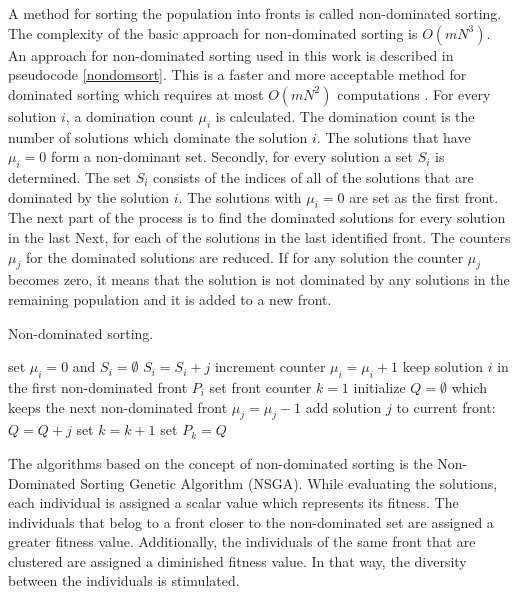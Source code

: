 A method for sorting the population into fronts is called non-dominated sorting. 
The complexity of the basic approach for non-dominated sorting is $O(mN^3)$.
An approach for non-dominated sorting used in this work is described in pseudocode 
\ref{nondomsort}. This is a faster and more acceptable method for dominated sorting which requires at most $O(mN^2)$ computations \cite{deb2001multi}.
For every solution $i$, a domination count $\mu_i$ is calculated. The domination count is the number of solutions which dominate the solution $i$. The solutions that have $\mu_i = 0$ form a non-dominant set.
Secondly, for every solution a set $S_i$ is determined. The set $S_i$ consists of the indices of all of the solutions that are dominated by the solution $i$. 
The solutions with $\mu_i=0$ are set as the first front. 
The next part of the process is to find the dominated solutions for every solution in the last 
Next, for each of the solutions in the last identified front. 
The counters $\mu_j$ for the dominated solutions are reduced. 
If for any solution the counter $\mu_j$ becomes zero, it means that the solution is not dominated by any solutions in the remaining population and it is added to a new front. 

\begin{algorithm}
\caption{Non-dominated sorting.\label{nondomsort}}
\begin{algorithmic}
\STATE set $\mu_i = 0$ and $S_i = \emptyset$
\ENDFOR
{}
\STATE $S_i = S_i + j$
\STATE increment counter $\mu_i = \mu_i + 1$
\ENDIF
{} 
\STATE keep solution $i$ in the first non-dominated front $P_i$
\STATE set front counter $k=1$
\ENDIF
\ENDFOR
{}
\STATE initialize $Q = \emptyset$ which keeps the next non-dominated front
\STATE $\mu_j = \mu_j - 1$
\STATE add solution $j$ to current front: $Q = Q + j$
\ENDIF
\ENDFOR
\STATE set $k = k+1$
\STATE set $P_k = Q$
\ENDWHILE
\end{algorithmic}
\end{algorithm}

The algorithms based on the concept of non-dominated sorting is the Non-Dominated Sorting Genetic Algorithm (NSGA). 
While evaluating the solutions, each individual is assigned a scalar value which represents its fitness. 
The individuals that belog to a front closer to the non-dominated set are assigned a greater fitness value. Additionally, the individuals of the same front that are clustered are assigned a diminished fitness value. 
In that way, the diversity between the individuals is stimulated. 

